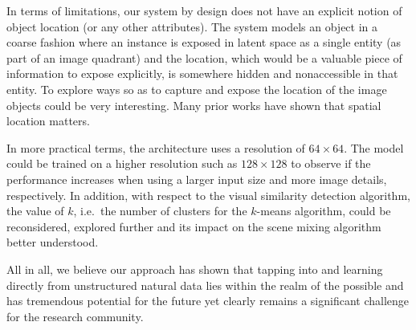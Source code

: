 \documentclass[a4paper,12pt]{report}
\begin{document}
In terms of limitations, our system by design does not have an explicit notion of object location (or any other attributes). The system models an object in a coarse fashion where an instance is exposed in latent space as a single entity (as part of an image quadrant) and the location, which would be a valuable piece of information to expose explicitly, is somewhere hidden and nonaccessible in that entity. To explore ways so as to capture and expose the location of the image objects could be very interesting. Many prior works have shown that spatial location matters.

In more practical terms, the architecture uses a resolution of $64 \times 64$. The model could be trained on a higher resolution such as $128 \times 128$ to observe if the performance increases when using a larger input size and more image details, respectively. In addition, with respect to the visual similarity detection algorithm, the value of $k$, i.e.\ the number of clusters for the $k$-means algorithm, could be reconsidered, explored further and its impact on the scene mixing algorithm better understood.

All in all, we believe our approach has shown that tapping into and learning directly from unstructured natural data lies within the realm of the possible and has tremendous potential for the future yet clearly remains a significant challenge for the research community.




\cleardoublepage
{}
{}
\listoffigures
\cleardoublepage
{}
{}
\listoftables
\newpage

\cleardoublepage
{}
{}
\printbibliography

\appendix




\end{document}
